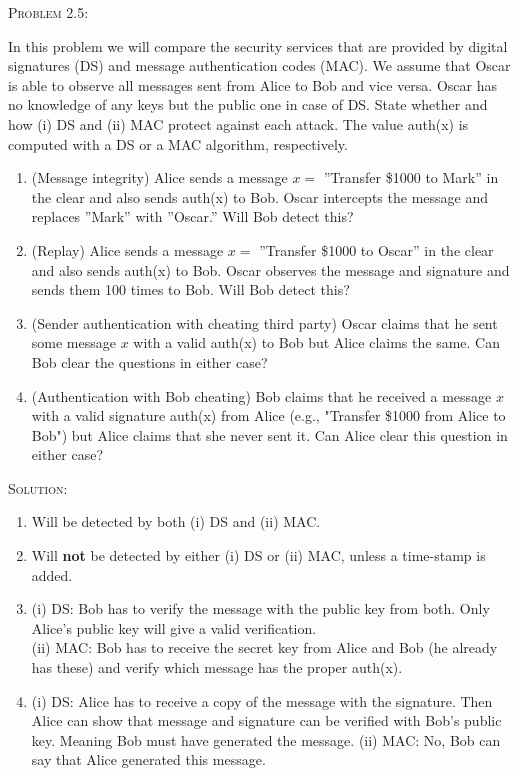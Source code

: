 \documentclass[12pt]{article}
\newenvironment{problem}[1]
{\begin{mdframed}[linewidth=0.8pt]
        \textsc{Problem #1:}

}
    {\end{mdframed}}
\newenvironment{solution}
    {\textsc{Solution:}\\}
    {\newpage}%
\begin{document}
	\begin{problem}{2.5}
		In this problem we will compare the security services that are provided
		by digital signatures (DS) and message authentication codes (MAC). We
		assume that Oscar is able to observe all messages sent from Alice to
		Bob and vice versa. Oscar has no knowledge of any keys but the public
		one in case of DS. State whether and how (i) DS and (ii) MAC protect
		against each attack. The value auth(x) is computed with a DS or a MAC
		algorithm, respectively.
		\begin{enumerate}[label=\alph*]
			\item (Message integrity) Alice sends a message $x=$ ''Transfer
				\$1000 to Mark'' in the clear and also sends auth(x) to
				Bob. Oscar intercepts the message and replaces ''Mark''
				with ''Oscar.'' Will Bob detect this?
			\item (Replay) Alice sends a message  $x=$ ''Transfer \$1000 to Oscar''
				in the clear and also sends auth(x) to Bob. Oscar observes
				the message and signature and sends them 100 times to Bob.
				Will Bob detect this?
			\item (Sender authentication with cheating third party) Oscar claims
				that he sent some message  $x$ with  a valid auth(x) to Bob
				but Alice claims the same. Can Bob clear the questions in
				either case?
			\item (Authentication with Bob cheating) Bob claims that he received  
				a message $x$ with a valid signature auth(x) from Alice
				(e.g., "Transfer \$1000 from Alice to Bob") but Alice claims
				that she never sent it. Can Alice clear this question in
				either case?
		\end{enumerate}
	\end{problem}
	\begin{solution}
		\begin{enumerate}[label=\alph*]
			\item Will be detected by both (i) DS and (ii) MAC.
			\item Will \textbf{not} be detected by either (i) DS or (ii) MAC,
				unless a time-stamp is added.
			\item (i) DS: Bob has to verify the message with the public key from
				both. Only Alice's public key will give a valid verification.\\
				(ii) MAC: Bob has to receive the secret key from Alice and Bob
				(he already has these) and verify which message has the proper auth(x).
			\item (i) DS: Alice has to receive a copy of the message with the signature.
				Then Alice can show that message and signature can be verified with Bob's
				public key. Meaning Bob must have generated the message.
				(ii) MAC: No, Bob can say that Alice generated this message.
		\end{enumerate}
	\end{solution}
\end{document}
